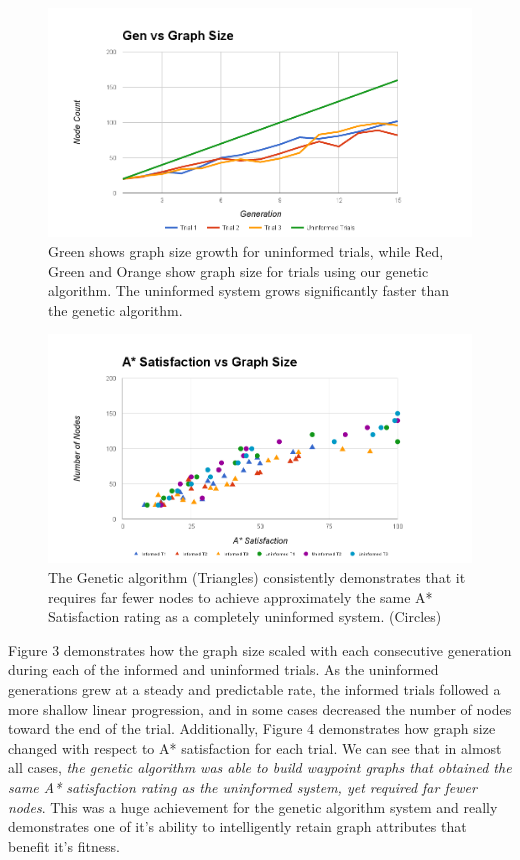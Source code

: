 		\begin{figure}
			\includegraphics[width=1.2\columnwidth]{tests/gengraphsize}
			\caption{Green shows graph size growth for uninformed trials, while Red, Green and Orange show graph size for trials using our genetic algorithm. The uninformed system grows significantly faster than the genetic algorithm.}
		\end{figure}
		
		\begin{figure}
			\includegraphics[width=1.2\columnwidth]{tests/satgraphsize}
			\caption{The Genetic algorithm (Triangles) consistently demonstrates that it requires far fewer nodes to achieve approximately the same A* Satisfaction rating as a completely uninformed system. (Circles)}
		\end{figure}
	
	Figure 3 demonstrates how the graph size scaled with each consecutive generation during each of the informed and uninformed trials. As the uninformed generations grew at a steady and predictable rate, the informed trials followed a more shallow linear progression, and in some cases decreased the number of nodes toward the end of the trial. Additionally, Figure 4 demonstrates how graph size changed with respect to A* satisfaction for each trial. We can see that in almost all cases, \textit{the genetic algorithm was able to build waypoint graphs that obtained the same A* satisfaction rating as the uninformed system, yet required far fewer nodes}. This was a huge achievement for the genetic algorithm system and really demonstrates one of it's ability to intelligently retain graph attributes that benefit it's fitness.
	